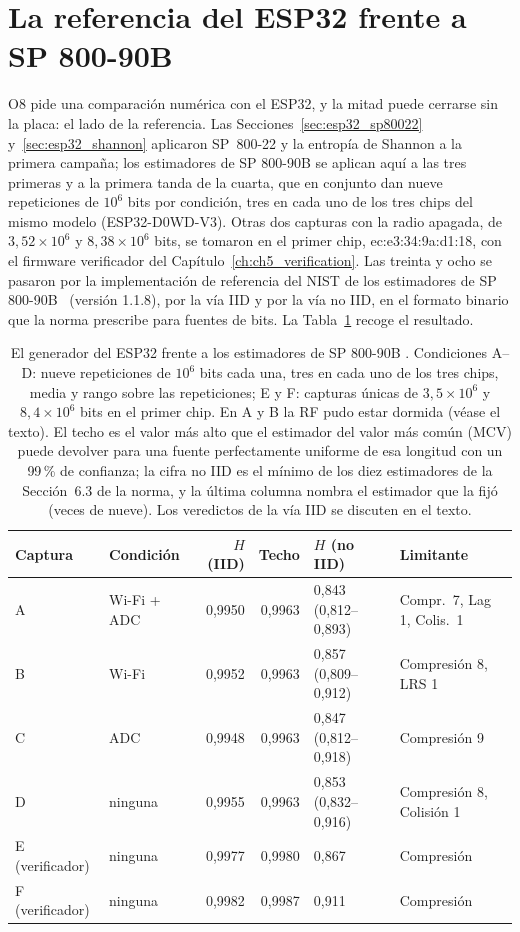 \section{La referencia del ESP32 frente a SP 800-90B}
\label{sec:esp32_90b}

O8 pide una comparación numérica con el ESP32, y la mitad puede cerrarse
sin la placa: el lado de la referencia. Las
Secciones~\ref{sec:esp32_sp80022} y~\ref{sec:esp32_shannon} aplicaron
SP~800-22 y la entropía de Shannon a la primera campaña; los estimadores
de SP 800-90B se aplican aquí a las tres primeras y a la primera tanda
de la cuarta, que en conjunto dan nueve repeticiones de $10^6$ bits por
condición, tres en cada uno de los tres chips del mismo modelo
(ESP32-D0WD-V3). Otras dos capturas con la radio
apagada, de $3{,}52\times10^6$ y $8{,}38\times10^6$ bits, se tomaron en
el primer chip, ec:e3:34:9a:d1:18, con
el firmware verificador del Capítulo~\ref{ch:ch5_verification}. Las
treinta y ocho se pasaron por la implementación de referencia del \ac{NIST} de
los estimadores de SP 800-90B~\cite{nist_ea_github, turan_2018_sp80090b}
(versión 1.1.8), por la vía IID y por la vía no IID, en el formato
binario que la norma prescribe para fuentes de bits. La
Tabla~\ref{tab:esp32_90b} recoge el resultado.

\begin{table}[htbp]
\centering
\caption{El generador del ESP32 frente a los estimadores de SP 800-90B \meas{}.
Condiciones A--D: nueve repeticiones de $10^6$ bits cada una, tres en cada
uno de los tres chips, media y rango sobre las repeticiones; E y F:
capturas únicas de $3{,}5\times10^6$ y $8{,}4\times10^6$ bits en el
primer chip. En A y B la RF pudo estar dormida (véase el texto). El techo es
el valor más alto que el estimador del valor más común (MCV) puede
devolver para una fuente perfectamente uniforme de esa longitud con un
99\,\% de confianza; la cifra no IID es el mínimo de los diez estimadores
de la Sección~6.3 de la norma, y la última columna nombra el estimador que
la fijó (veces de nueve). Los veredictos de la vía IID se discuten en el
texto.}
\label{tab:esp32_90b}
\footnotesize
\begin{tabular}{@{}llrrll@{}}
\toprule
Captura & Condición & $H$ (IID) & Techo & $H$ (no IID) & Limitante \\
\midrule
A & Wi-Fi + ADC & 0,9950 & 0,9963 & 0,843 (0,812--0,893) & Compr.\ 7, Lag 1, Colis.\ 1 \\
B & Wi-Fi       & 0,9952 & 0,9963 & 0,857 (0,809--0,912) & Compresión 8, LRS 1 \\
C & ADC         & 0,9948 & 0,9963 & 0,847 (0,812--0,918) & Compresión 9 \\
D & ninguna     & 0,9955 & 0,9963 & 0,853 (0,832--0,916) & Compresión 8, Colisión 1 \\
E (verificador) & ninguna & 0,9977 & 0,9980 & 0,867 & Compresión \\
F (verificador) & ninguna & 0,9982 & 0,9987 & 0,911 & Compresión \\
\bottomrule
\end{tabular}
\end{table}

